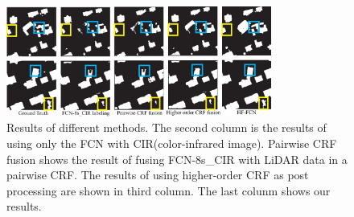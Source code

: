 \begin{figure}
\vspace{-0.2cm}
\centering
\includegraphics[width=8.7cm]{Figures/Potsdam_compared_results.eps}
\caption{Results of different methods. The second column is the results of using only the FCN with CIR(color-infrared image). Pairwise CRF fusion shows the result of fusing FCN-8s\_CIR with LiDAR data in a pairwise CRF. The results of using higher-order CRF\cite{IEEEexample:liu2017dense} as post processing are shown in third column. The last colunm shows our results.}
\label{fig:Potsdam-compared-others}
\end{figure}
